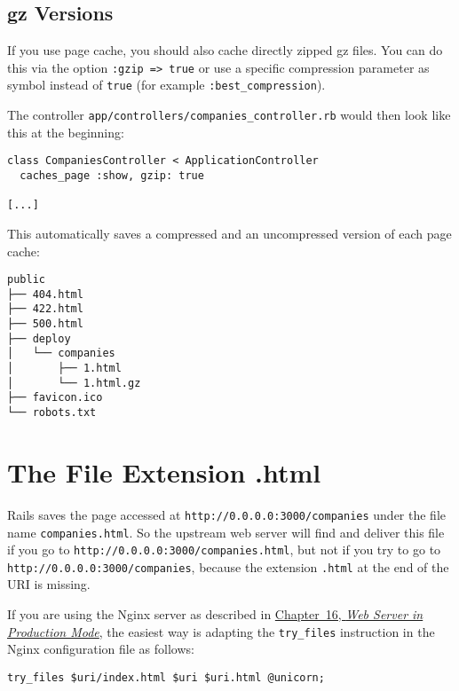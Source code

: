 \documentclass[a4paper]{book}
\newcommand{\chap}[1]{\newpage\thispagestyle{empty}\chapter{#1}\label{chap:\thechapter}}
\begin{document}
\section{gz Versions}\label{gz-versions}

If you use page cache, you should also cache directly zipped gz files. You can do this via the option \texttt{:gzip =\textgreater{} true} or use a specific compression parameter as symbol instead of \texttt{true} (for example \texttt{:best\_compression}).

The controller \texttt{app/controllers/companies\_controller.rb} would then look like this at the beginning:

\begin{shaded}\begin{verbatim}
class CompaniesController < ApplicationController
  caches_page :show, gzip: true

[...]
\end{verbatim}\end{shaded}

This automatically saves a compressed and an uncompressed version of each page cache:

\begin{shaded}\begin{verbatim}
public
├── 404.html
├── 422.html
├── 500.html
├── deploy
│   └── companies
│       ├── 1.html
│       └── 1.html.gz
├── favicon.ico
└── robots.txt
\end{verbatim}\end{shaded}

\chap{The File Extension .html}\label{the-file-extension-.html}

Rails saves the page accessed at \texttt{http://0.0.0.0:3000/companies} under the file name \texttt{companies.html}. So the upstream web server will find and deliver this file if you go to \texttt{http://0.0.0.0:3000/companies.html}, but not if you try to go to \texttt{http://0.0.0.0:3000/companies}, because the extension \texttt{.html} at the end of the URI is missing.

If you are using the Nginx server as described in \hyperref[railsux5fproductionux5fwebserver]{Chapter~16, \emph{Web Server in Production Mode}}, the easiest way is adapting the \texttt{try\_files} instruction in the Nginx configuration file as follows:

\begin{shaded}\begin{verbatim}
try_files $uri/index.html $uri $uri.html @unicorn;
\end{verbatim}\end{shaded}
\end{document}

